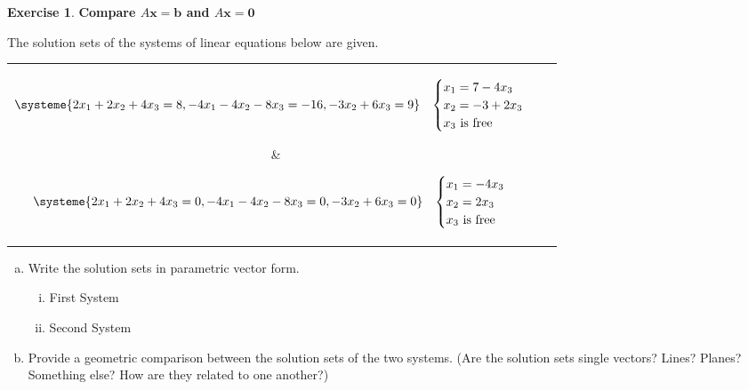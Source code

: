 \documentclass[10pt]{book}
\theoremstyle{definition}
\newtheorem{exercise}{Exercise}[section]
\newcommand{\vect}[1]{\ensuremath{\boldsymbol{\mathbf{#1}}}}
\newcommand{\Axb}{A\vect{x}=\vect{b}}
\newcommand{\Axz}{A\vect{x}=\vect{0}}
\begin{document}
\newpage


\begin{exercise} %
	\textbf{Compare $\Axb$ and $\Axz$} \par
	The solution sets of the systems of linear equations below are given.
	
	\noindent	
	\begin{tabular}{c|c}
		\parbox{0.5\linewidth}{%
			\begin{align*}
			\systeme{2x_1+2x_2+4x_3=8,-4x_1-4x_2-8x_3=-16,-3x_2+6x_3=9}&&
			\begin{cases}x_1 = 7-4x_3 \\ x_2 =-3+2x_3 \\ x_3 \text{ is free}\end{cases}
			\end{align*}}
		&
		\parbox{0.5\linewidth}{%
			\begin{align*}
			\systeme{2x_1+2x_2+4x_3=0,-4x_1-4x_2-8x_3=0,-3x_2+6x_3=0}&&
			\begin{cases}x_1 = -4x_3 \\ x_2 =2x_3 \\ x_3 \text{ is free}\end{cases}
			\end{align*}}
	\end{tabular}
	
	\begin{enumerate}[(a)]
		\item Write the solution sets in parametric vector form.
		\begin{multicols}{2}
			\begin{enumerate}[(i)]
				\item First System
				\item Second System
			\end{enumerate}
		\end{multicols}
		\vfill
		\item Provide a geometric comparison between the solution sets of the two systems. (Are the solution sets single vectors? Lines? Planes? Something else? How are they related to one another?)
		\vspace{1in}
	\end{enumerate}
\end{exercise}
\end{document}
